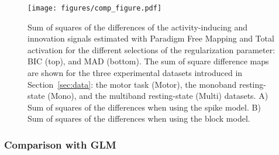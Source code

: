 
\begin{figure}[t!]
    \begin{center}
        \texttt{[image: figures/comp\_figure.pdf]}
    \end{center}
    \caption{Sum of squares of the differences of the activity-inducing and innovation signals estimated with Paradigm Free Mapping and Total activation for the different selections of the regularization parameter: BIC (top), and MAD (bottom). The sum of square difference maps are shown for the three experimental datasets introduced in Section~\ref{sec:data}: the motor task (Motor), the monoband resting-state (Mono), and the multiband resting-state (Multi) datasets. A) Sum of squares of the differences when using the spike model. B) Sum of squares of the differences when using the block model.}
\label{fig:rss}
\end{figure}

\subsubsection{Comparison with GLM}


